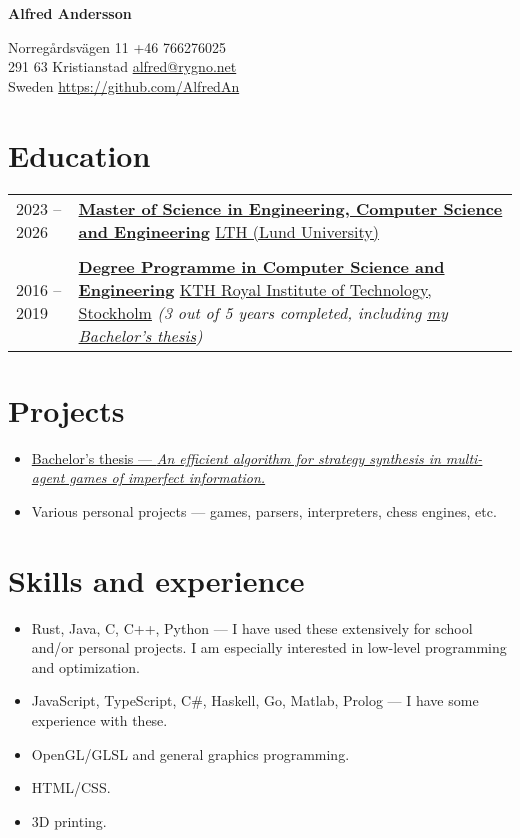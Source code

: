 \documentclass[11pt]{article}
\begin{document}
\begin{center}
     \Huge{\textbf{Alfred Andersson}}
\end{center}
Norregårdsvägen 11 \hfill +46 766276025 \\
291 63 Kristianstad \hfill \href{mailto:alfred@rygno.net}{alfred@rygno.net} \\ 
Sweden \hfill \url{https://github.com/AlfredAn}

\section{Education}
\begin{tabular}{ l p{405pt} }
    2023 -- 2026 & \href{https://www.lth.se/utbildning/datateknik300/}{\textbf{Master of Science in Engineering, Computer Science and Engineering}}
    \newline \href{https://www.lth.se/english/}{LTH (Lund University)} \\ \\

    2016 -- 2019 & \href{https://www.kth.se/utbildning/civilingenjor/datateknik}{\textbf{Degree Programme in Computer Science and Engineering}}
    \newline \href{https://www.kth.se/en}{KTH Royal Institute of Technology, Stockholm}
    \newline \textit{(3 out of 5 years completed, including \href{https://kth.diva-portal.org/smash/record.jsf?pid=diva2\%3A1701708\&dswid=-199}{my Bachelor's thesis})}
\end{tabular}

\section{Projects}
\begin{itemize}
    \item \href{https://kth.diva-portal.org/smash/record.jsf?pid=diva2\%3A1701708\&dswid=-199}{Bachelor's thesis --- \textit{An efficient algorithm for strategy synthesis in multi-agent games of imperfect information.}}
    \item Various personal projects --- games, parsers, interpreters, chess engines, etc.
\end{itemize}

\section{Skills and experience}
\begin{itemize}
    \item Rust, Java, C, C++, Python --- I have used these extensively for school and/or personal projects. I am especially interested in low-level programming and optimization.
    \item JavaScript, TypeScript, C\#, Haskell, Go, Matlab, Prolog --- I have some experience with these.
    \item OpenGL/GLSL and general graphics programming.
    \item HTML/CSS.
    \item 3D printing.
\end{itemize}
\end{document}

